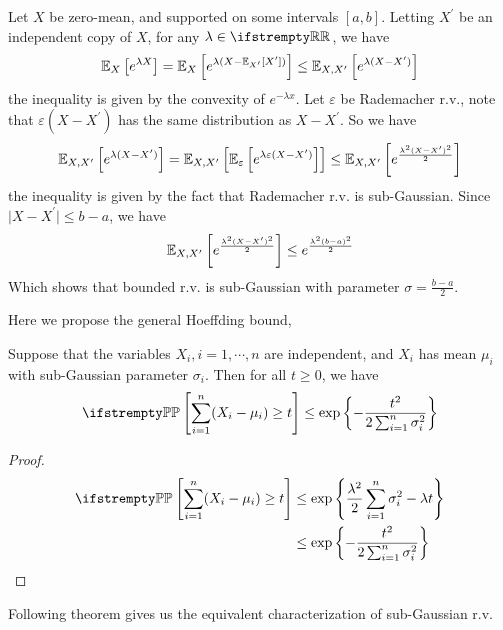\documentclass{paper}
\begin{document}
\begin{exmp}
	Let $X$ be zero-mean, and supported on some intervals $[a, b]$. Letting $X^\prime$ be an independent copy of  $X$, for any $\lambda\in\RR$, we have
	\[
		\mathbb{E}_{X}\left[e^{\lambda X}\right] = \mathbb{E}_{X} \left[e^{\lambda(X-\mathbb{E}_{X^\prime}[X^\prime])}\right] \leq \mathbb{E}_{X, X^\prime}\left[e^{\lambda(X-X^\prime)}\right]
	\]
	the inequality is given by the convexity of $e^{-\lambda x}$. Let $\varepsilon$ be Rademacher r.v., note that $\varepsilon(X-X^\prime)$ has the same distribution as $X-X^\prime$.
	So we have
	\[
		\mathbb{E}_{X, X^\prime}\left[e^{\lambda(X-X^\prime)}\right] =
		\mathbb{E}_{X, X^\prime}\left[\mathbb{E}_{\varepsilon}\left[e^{\lambda\varepsilon(X-X^\prime)}\right]\right] \leq
		\mathbb{E}_{X, X^\prime}\left[e^{\frac{\lambda^2(X-X^\prime)^2}{2}}\right]
	\]
	the inequality is given by the fact that Rademacher r.v. is sub-Gaussian. Since $\vert X-X^\prime\vert\leq b-a$, we have
	\[
		\mathbb{E}_{X, X^\prime}\left[e^{\frac{\lambda^2(X-X^\prime)^2}{2}}\right] \leq e^{\frac{\lambda^2(b-a)^2}{2}}
	\]
	Which shows that bounded r.v. is sub-Gaussian with parameter $\sigma = \frac{b-a}{2}$.
\end{exmp}
Here we propose the general Hoeffding bound,
\begin{prop}
	Suppose that the variables $X_i, i=1,\cdots, n$ are independent, and $X_i$ has mean $\mu_i$ with sub-Gaussian parameter $\sigma_i$. Then for all $t\geq 0$, we have
	\[
		\PP\left[\sum_{i=1}^n (X_i-\mu_i)\geq t\right] \leq \exp{\left\{-\frac{t^2}{2\sum_{i=1}^n\sigma_i^2}\right\}}
	\]
\end{prop}
\begin{proof}
	\begin{align*}
		\PP\left[\sum_{i=1}^n (X_i-\mu_i)\geq t\right] & \leq \exp\left\{\frac{\lambda^2}{2}\sum_{i=1}^n\sigma_i^2 - \lambda t\right\} \\
		                                               & \leq \exp{\left\{-\frac{t^2}{2\sum_{i=1}^n\sigma_i^2}\right\}}
	\end{align*}
\end{proof}
Following theorem gives us the equivalent characterization of sub-Gaussian r.v.
\end{document}
